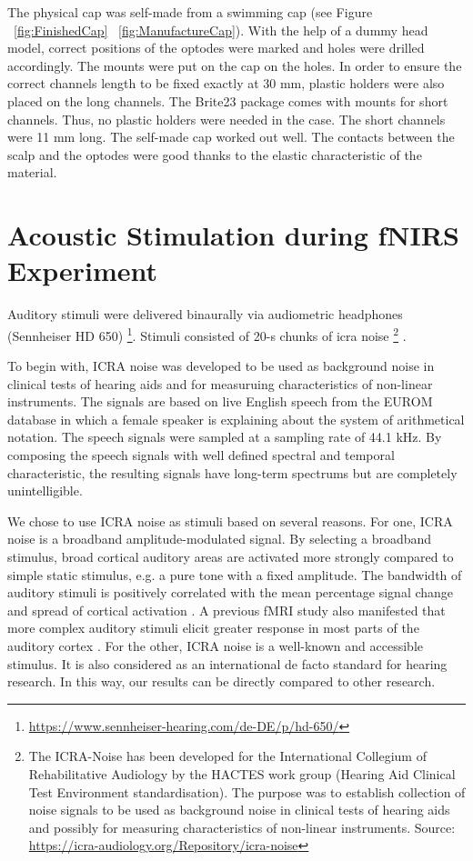 The physical cap was self-made from a swimming cap (see Figure ~\ref {fig:FinishedCap} ~\ref {fig:ManufactureCap}). With the help of a dummy head model, correct positions of the optodes were marked and holes were drilled accordingly. The mounts were put on the cap on the holes. In order to ensure the correct channels length to be fixed exactly at 30 mm, plastic holders were also placed on the long channels. The Brite23 package comes with mounts for short channels. Thus, no plastic holders were needed in the case. The short channels were 11 mm long. The self-made cap worked out well. The contacts between the scalp and the optodes were good thanks to the elastic characteristic of the material.



\section {Acoustic Stimulation during fNIRS Experiment}
Auditory stimuli were delivered binaurally via audiometric headphones (Sennheiser HD 650) \footnote {\url{https://www.sennheiser-hearing.com/de-DE/p/hd-650/}}. Stimuli consisted of 20-s chunks of \acrshort{icra} noise \footnote {The ICRA-Noise has been developed for the International Collegium of Rehabilitative Audiology by the HACTES work group (Hearing Aid Clinical Test Environment standardisation). The purpose was to establish collection of noise signals to be used as background noise in clinical tests of hearing aids and possibly for measuring characteristics of non-linear instruments. Source: \url{https://icra-audiology.org/Repository/icra-noise}} \citep {Dreschler}. 

To begin with, ICRA noise was developed to be used as background noise in clinical tests of hearing aids and for measuruing characteristics of non-linear instruments. The signals are based on live English speech from the EUROM database \citep {chanEUROM} in which a female speaker is explaining about the system of arithmetical notation. The speech signals were sampled at a sampling rate of 44.1 kHz. By composing the speech signals with well defined spectral and temporal characteristic, the resulting signals have long-term spectrums but are completely unintelligible. 
 
We chose to use ICRA noise as stimuli based on several reasons. For one, ICRA noise is a broadband amplitude-modulated signal. By selecting a broadband stimulus, broad cortical auditory areas are activated more strongly compared to simple static stimulus, e.g. a pure tone with a fixed amplitude. The bandwidth of auditory stimuli is positively correlated with the mean percentage signal change and spread of cortical activation \citep {Hall}. A previous fMRI study also manifested that more complex auditory stimuli elicit greater response in most parts of the auditory cortex \citep {Belin2002}. For the other, ICRA noise is a well-known and accessible stimulus. It is also considered as an international de facto standard for hearing research. In this way, our results can be directly compared to other research.
 
